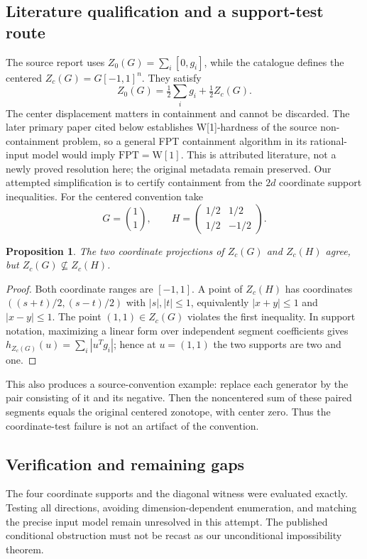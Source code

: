 \documentclass[11pt]{article}
\newtheorem{proposition}{Proposition}
\begin{document}
\subsection{Literature qualification and a support-test route}
The source report uses $Z_0(G)=\sum_i[0,g_i]$, while the catalogue defines the centered $Z_c(G)=G[-1,1]^n$. They satisfy
\[
 Z_0(G)=\tfrac12\sum_i g_i+\tfrac12 Z_c(G).
\]
The center displacement matters in containment and cannot be discarded. The later primary paper cited below establishes W[1]-hardness of the source non-containment problem, so a general FPT containment algorithm in its rational-input model would imply $\mathrm{FPT}=\mathrm{W[1]}$. This is attributed literature, not a newly proved resolution here; the original metadata remain preserved.
Our attempted simplification is to certify containment from the $2d$ coordinate support inequalities. For the centered convention take
\[
 G=\binom11,\qquad H=\begin{pmatrix}1/2&1/2\\1/2&-1/2\end{pmatrix}.
\]
\begin{proposition}
The two coordinate projections of $Z_c(G)$ and $Z_c(H)$ agree, but $Z_c(G)\nsubseteq Z_c(H)$.
\end{proposition}
\begin{proof}
Both coordinate ranges are $[-1,1]$. A point of $Z_c(H)$ has coordinates $((s+t)/2,(s-t)/2)$ with $|s|,|t|\le1$, equivalently $|x+y|\le1$ and $|x-y|\le1$. The point $(1,1)\in Z_c(G)$ violates the first inequality. In support notation, maximizing a linear form over independent segment coefficients gives $h_{Z_c(G)}(u)=\sum_i|u^Tg_i|$; hence at $u=(1,1)$ the two supports are two and one.
\end{proof}
This also produces a source-convention example: replace each generator by the pair consisting of it and its negative. Then the noncentered sum of these paired segments equals the original centered zonotope, with center zero. Thus the coordinate-test failure is not an artifact of the convention.
\subsection{Verification and remaining gaps}
The four coordinate supports and the diagonal witness were evaluated exactly. Testing all directions, avoiding dimension-dependent enumeration, and matching the precise input model remain unresolved in this attempt. The published conditional obstruction must not be recast as our unconditional impossibility theorem.
\end{document}
